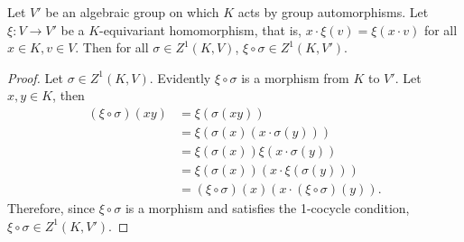 \begin{lemma} \label{xi}
	Let $V'$ be an algebraic group on which $K$ acts by group automorphisms.
	Let $\xi: V \rightarrow V'$ be a $K$-equivariant homomorphism, that is, $x \cdot \xi(v) = \xi(x \cdot v)$ for all $x \in K, v \in V$. Then for all $\sigma \in Z^1(K, V)$, $\xi \circ \sigma \in Z^1(K, V')$. 
\end{lemma}
\begin{proof}
	Let $\sigma \in Z^1(K, V)$. Evidently $\xi \circ \sigma$ is a morphism from $K$ to $V'$. Let $x, y \in K$, then
	\begin{align*}
		(\xi \circ \sigma)(xy) &= \xi\left(\sigma(xy)\right) \\
			&= \xi\left(\sigma(x)(x \cdot \sigma(y))\right) \\
			&= \xi(\sigma(x))\xi(x \cdot \sigma(y)) \\
			&= \xi(\sigma(x))\left(x \cdot \xi(\sigma(y))\right) \\
			&= (\xi \circ \sigma)(x)\left(x \cdot (\xi \circ \sigma)(y)\right).
	\end{align*}
	Therefore, since $\xi \circ \sigma$ is a morphism and satisfies the 1-cocycle condition, $\xi \circ \sigma \in Z^1(K, V')$.
\end{proof}

